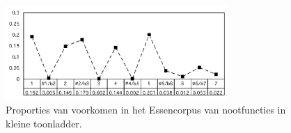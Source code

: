 \begin{figure}[!ht]
  \centering
  \includegraphics[width=0.75\textwidth]{2_Objectieve_Beoordeling/key_minor}
  \caption{Proporties van voorkomen in het Essencorpus van nootfuncties in kleine toonladder.}
  \label{figuur:key_minor}
\end{figure}

